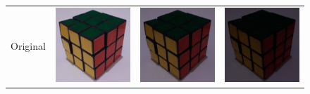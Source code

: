 \begin{figure}
    \newlength{\rubiklength}
    \setlength{\rubiklength}{3cm}
    \centering
    \begin{tabular}{rccc}
         Original &
         \includegraphics[width=\rubiklength]{img/rubik/1_orig.jpg} & 
         \includegraphics[width=\rubiklength]{img/rubik/2_orig.jpg} & \includegraphics[width=\rubiklength]{img/rubik/3_orig.jpg}\\
         

\end{tabular}
\end{figure}
